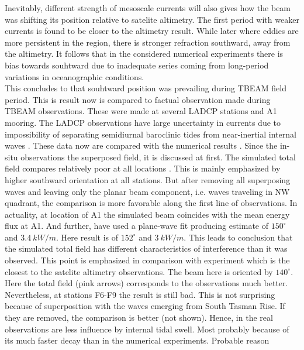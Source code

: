 \documentclass[12pt]{article}
\begin{document}
Inevitably, different strength of mesoscale currents will  also gives how the 
beam was shifting its position relative to satelite 
altimetry. The first period with weaker currents is found to be closer to the altimetry result. 
While later where eddies are more persistent in the region, there is stronger refraction southward, 
away from the altimetry. It follows that in the considered numerical experiments there is bias 
towards souhtward due to inadequate series coming from long-period variations in oceanographic 
conditions.\\
This concludes to that souhtward position was prevailing during TBEAM field period. This is result 
now is compared to factual observation made during TBEAM observations. These were made at several 
LADCP stations and A1 mooring. The LADCP observations have large uncertainty in currents due 
to impossibility of separating semidiurnal baroclinic tides from near-inertial internal waves 
\citep{waterhouse2018observations}. These data now are compared with the numerical results 
. Since the in-situ observations the superposed field, it is discussed at 
first. The simulated total field compares relatively poor at all locations  
. This is mainly emphasized by higher 
southward orientation at all stations. But after removing all superposing waves and leaving only 
the planar beam component, i.e. waves traveling in NW quadrant, the comparison is more 
favorable along the first line of observations. In actuality, at location of A1 the simulated beam 
coincides with the mean energy flux at A1. And further, \citep{waterhouse2018observations} have 
used a plane-wave fit producing estimate of $150^{\circ}$ and $3.4~kW/m$. Here result is of 
$152^{\circ}$ and $3~kW/m$. This leads to conclusion that the simulated total field has different 
characteristics of interference than it was observed. This point is emphasized in comparison with 
experiment which is the closest to the satelite altimetry observations. The beam here is oriented 
by $140^{\circ}$. Here the total field (pink arrows) corresponds to the observations much better. 
Nevertheless, at stations F6-F9 the result is still bad. This is not surprising because of 
superposition with the waves emerging from South Tasman Rise. If they are removed, the comparison 
is better (not shown). Hence, in the real observations are less influence by internal tidal swell. 
Most probably because of its much faster decay than in the numerical experiments. Probable reason 
\end{document}
